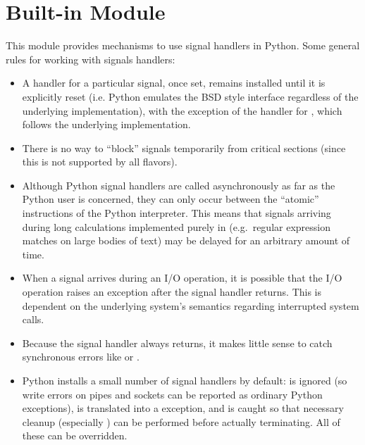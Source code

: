 \section{Built-in Module }



This module provides mechanisms to use signal handlers in Python.
Some general rules for working with signals handlers:

\begin{itemize}

\item
A handler for a particular signal, once set, remains installed until
it is explicitly reset (i.e. Python emulates the BSD style interface
regardless of the underlying implementation), with the exception of
the handler for , which follows the underlying
implementation.

\item
There is no way to ``block'' signals temporarily from critical
sections (since this is not supported by all \UNIX{} flavors).

\item
Although Python signal handlers are called asynchronously as far as
the Python user is concerned, they can only occur between the
``atomic'' instructions of the Python interpreter.  This means that
signals arriving during long calculations implemented purely in \C{}
(e.g.\ regular expression matches on large bodies of text) may be
delayed for an arbitrary amount of time.

\item
When a signal arrives during an I/O operation, it is possible that the
I/O operation raises an exception after the signal handler returns.
This is dependent on the underlying \UNIX{} system's semantics regarding
interrupted system calls.

\item
Because the \C{} signal handler always returns, it makes little sense to
catch synchronous errors like  or .

\item
Python installs a small number of signal handlers by default:
 is ignored (so write errors on pipes and sockets can be
reported as ordinary Python exceptions),  is translated
into a  exception, and  is
caught so that necessary cleanup (especially ) can
be performed before actually terminating.  All of these can be
overridden.


\end{itemize}
